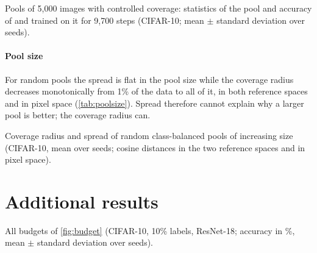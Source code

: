 \begin{table}[h]
\centering
\small
\caption{Pools of 5,000 images with controlled coverage: statistics of the pool and accuracy of \supcon and
\simclr trained on it for 9,700 steps (CIFAR-10; mean $\pm$ standard deviation over seeds).}
\label{tab:coverage}
\begin{adjustbox}{max width=\linewidth}

\end{adjustbox}
\end{table}

\paragraph{Pool size}
For random pools the spread is flat in the pool size while the coverage radius decreases monotonically from
1\% of the data to all of it, in both reference spaces and in pixel space (\cref{tab:poolsize}). Spread therefore
cannot explain why a larger pool is better; the coverage radius can.

\begin{table}[h]
\centering
\small
\caption{Coverage radius and spread of random class-balanced pools of increasing size (CIFAR-10, mean over
seeds; cosine distances in the two reference spaces and in pixel space).}
\label{tab:poolsize}
\begin{adjustbox}{max width=\linewidth}

\end{adjustbox}
\end{table}

\section{Additional results}
\label{app:extra}

\begin{table}[h]
\centering
\small
\caption{All budgets of \cref{fig:budget} (CIFAR-10, 10\% labels, ResNet-18; accuracy in \%, mean $\pm$
standard deviation over seeds).}
\label{tab:budgets}
\begin{adjustbox}{max width=\linewidth}

\end{adjustbox}
\end{table}

